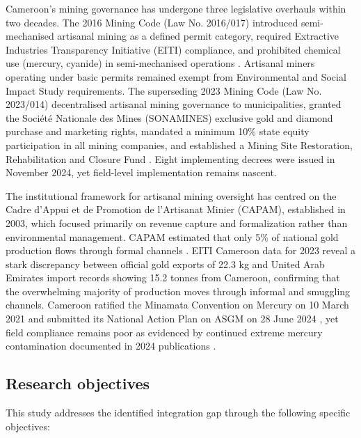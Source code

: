 \documentclass[preprint,12pt,authoryear]{elsarticle}
\begin{document}
Cameroon's mining governance has undergone three legislative overhauls within two decades. The 2016 Mining Code (Law No. 2016/017) introduced semi-mechanised artisanal mining as a defined permit category, required Extractive Industries Transparency Initiative (EITI) compliance, and prohibited chemical use (mercury, cyanide) in semi-mechanised operations \citep{RepublicOfCameroon2016}. Artisanal miners operating under basic permits remained exempt from Environmental and Social Impact Study requirements. The superseding 2023 Mining Code (Law No. 2023/014) decentralised artisanal mining governance to municipalities, granted the Soci\'{e}t\'{e} Nationale des Mines (SONAMINES) exclusive gold and diamond purchase and marketing rights, mandated a minimum 10\% state equity participation in all mining companies, and established a Mining Site Restoration, Rehabilitation and Closure Fund \citep{UNCTAD2023}. Eight implementing decrees were issued in November 2024, yet field-level implementation remains nascent.

The institutional framework for artisanal mining oversight has centred on the Cadre d'Appui et de Promotion de l'Artisanat Minier (CAPAM), established in 2003, which focused primarily on revenue capture and formalization rather than environmental management. CAPAM estimated that only 5\% of national gold production flows through formal channels \citep{Weng2022}. EITI Cameroon data for 2023 reveal a stark discrepancy between official gold exports of 22.3 kg and United Arab Emirates import records showing 15.2 tonnes from Cameroon, confirming that the overwhelming majority of production moves through informal and smuggling channels. Cameroon ratified the Minamata Convention on Mercury on 10 March 2021 and submitted its National Action Plan on ASGM on 28 June 2024 \citep{Minamata2024}, yet field compliance remains poor as evidenced by continued extreme mercury contamination documented in 2024 publications \citep{Fonshiynwa2024, Mahmoudou2024}.

\subsection{Research objectives}

This study addresses the identified integration gap through the following specific objectives:
\end{document}
